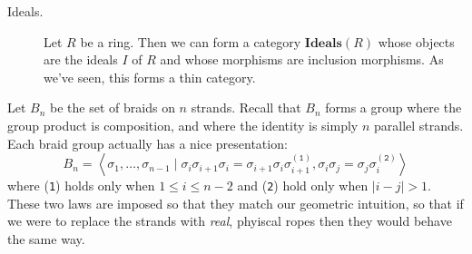 \begin{example}
\begin{description}
            \item[Ideals.]
            Let $R$ be a ring. Then we can form a category $\textbf{Ideals}(R)$ 
            whose objects are the ideals $I$ of $R$ and whose morphisms are inclusion 
            morphisms. As we've seen, this forms a thin category. 
        \end{description}

    \end{example}

    \begin{example}
        Let $B_n$ be the set of braids on $n$ strands. Recall that 
        $B_n$ forms a group where the group product is composition, and where the identity is simply 
        $n$ parallel strands. Each braid group actually has a nice presentation:
        \[
            B_n = \left< \sigma_1, \dots, \sigma_{n-1} \mid \sigma_i\sigma_{i+1}\sigma_{i} = \sigma_{i+1}\sigma_{i}\sigma_{i+1}^{(\texttt{1})}, \sigma_i\sigma_j = \sigma_j\sigma_i^{(\texttt{2})} \right>   
        \]
        where (\texttt{1}) holds only when $1 \le i \le n - 2$ and (\texttt{2}) hold only when 
        $|i - j| > 1$. These two laws are imposed so that they match our geometric intuition, so that
        if we were to replace the strands with \emph{real}, phyiscal 
        ropes then they would behave the same way.


\end{example}
